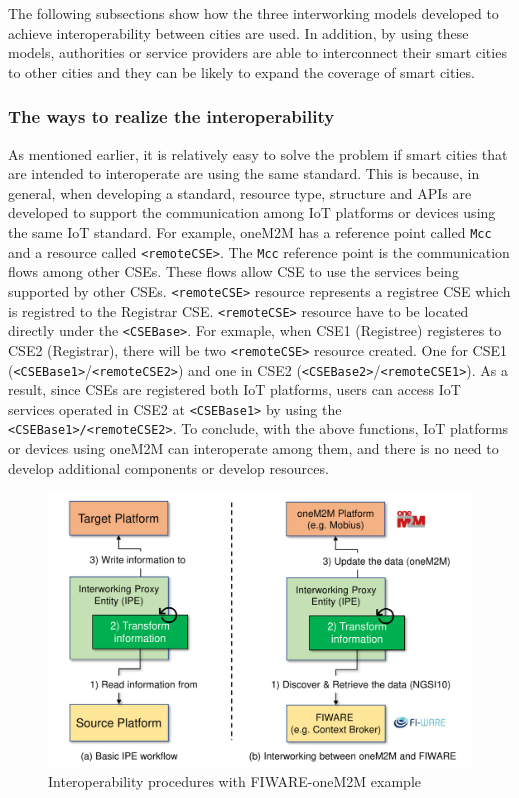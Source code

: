 The following subsections show how the three interworking models developed to achieve interoperability between cities are used. In addition, by using these models, authorities or service providers are able to interconnect their smart cities to other cities and they can be likely to expand the coverage of smart cities.

\subsubsection{The ways to realize the interoperability}
As mentioned earlier, it is relatively easy to solve the problem if smart cities that are intended to interoperate are using the same standard. This is because, in general, when developing a standard, resource type, structure and APIs are developed to support the communication among IoT platforms or devices using the same IoT standard. For example, oneM2M has a reference point called \texttt{Mcc} and a resource called \texttt{<remoteCSE>}. The \texttt{Mcc} reference point is the communication flows among other CSEs. These flows allow CSE to use the services being supported by other CSEs. \texttt{<remoteCSE>} resource represents a registree CSE which is registred to the Registrar CSE. \texttt{<remoteCSE>} resource have to be located directly under the \texttt{<CSEBase>}.  For exmaple, when CSE1 (Registree) registeres to CSE2 (Registrar), there will be two \texttt{<remoteCSE>} resource created. One for CSE1 (\texttt{<CSEBase1>}/\texttt{<remoteCSE2>}) and one in CSE2  (\texttt{<CSEBase2>}/\texttt{<remoteCSE1>}). As a result, since CSEs are registered both IoT platforms, users can access IoT services operated in CSE2 at \texttt{<CSEBase1>} by using the \texttt{<CSEBase1>/<remoteCSE2>}. To conclude, with the above functions, IoT platforms or devices using oneM2M can interoperate among them, and there is no need to develop additional components or develop resources.

\begin{figure}[H]			%
	\centering
	\includegraphics[width=\textwidth]{figures/fig_interworking_proxy.pdf}
    \caption{Interoperability procedures with FIWARE-oneM2M
example}
    \label{fig:interworking_proxy_entity}
\end{figure}

